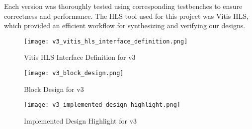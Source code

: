 \documentclass[conference]{IEEEtran}
\begin{document}
Each version was thoroughly tested using corresponding testbenches to ensure correctness and performance. The HLS tool used for this project was Vitis HLS, which provided an efficient workflow for synthesizing and verifying our designs.


\begin{figure}[htbp]
    \centering
    \texttt{[image: v3\_vitis\_hls\_interface\_definition.png]}
    \caption{Vitis HLS Interface Definition for v3}
    \label{v3_vitis_hls_interface_definition}
\end{figure}

\begin{figure}[htbp]
    \centering
    \texttt{[image: v3\_block\_design.png]}
    \caption{Block Design for v3}
    \label{fig:v3_block_design}
\end{figure}

\begin{figure}[htbp]
    \centering
    \texttt{[image: v3\_implemented\_design\_highlight.png]}
    \caption{Implemented Design Highlight for v3}
    \label{fig:v3_implemented_design_highlight}
\end{figure}


\end{document}
